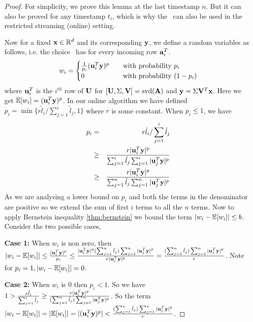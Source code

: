 \begin{proof}{\label{proof:onlineGuarantee}}
 For simplicity, we prove this lemma at the last timestamp $n$. But it can also be proved for any timestamp $t_{i}$, which is why the \online~can also be used in the restricted streaming (online) setting.
 
 Now for a fixed $\*x \in \~R^{d}$ and its corresponding $\*y$, we define a random variables as follows, i.e. the choice \online~has for every incoming row $\*a_{i}^{T}$.
 \[ w_{i} =
  \begin{cases}
    \frac{1}{p_{i}}(\*u_{i}^{T}\*y)^{p}  & \quad \text{with probability } p_{i} \\
    0 & \quad \text{with probability } (1-p_{i})
  \end{cases}
\]
where $\*u_{i}^{T}$ is the $i^{th}$ row of $\*U$ for $[\*U,\Sigma,\*V] = \mbox{svd}(\*A)$ and $\*y = \Sigma\*V^{T}\*x$. Here we get $\~E[w_{i}] = (\*u_{i}^{T}\*y)^{p}$. In our online algorithm we have defined $p_{i} = \min\{r\tilde{l}_{i}/\sum_{j=1}^{i}\tilde{l}_{j},1\}$ where $r$ is some constant. When $p_{i} \leq 1$, we have
\begin{eqnarray*}
 p_{i} &=& r\tilde{l}_{i}/\sum_{j=1}^{i}\tilde{l}_{j} \\
 &\geq& \frac{r|\*u_{i}^{T}\*y|^{p}}{\sum_{j=1}^{i}\tilde{l}_{j}\sum_{j=1}^{i}|\*u_{j}^{T}\*y|^{p}} \\ 
 &\geq& \frac{r|\*u_{i}^{T}\*y|^{p}}{\sum_{j=1}^{n}\tilde{l}_{j}\sum_{j=1}^{n}|\*u_{j}^{T}\*y|^{p}}
\end{eqnarray*}
As we are analysing a lower bound on $p_{i}$ and both the terms in the denominator are positive so we extend the sum of first $i$ terms to all the $n$ terms. Now to apply Bernstein inequality \ref{thm:bernstein} we bound the term $\vert w_{i} - \~E[w_{i}]\vert \leq b$. Consider the two possible cases,
 
 \textbf{Case 1:} When $w_{i}$ is non zero, then $|w_{i} - \~E[w_{i}]| \leq \frac{|\*u_{i}^{T}\*y|^{p}}{p_{i}} \leq \frac{|\*u_{i}^{T}\*y|^{p}(\sum_{j=1}^{n} \tilde{l}_{j})\sum_{j=1}^{n} |\*u_{j}^{T}\*y|^{p}}{r|\*u_{i}^{T}\*y|^{p}} = \frac{(\sum_{j=1}^{n} \tilde{l}_{j})\sum_{j=1}^{n} |\*u_{j}^{T}\*y|^{p}}{r}$. Note for $p_{i}=1, \vert w_{i} - \~E[w_{i}]\vert = 0$.
 
 \textbf{Case 2:} When $w_{i}$ is $0$ then $p_{i} < 1$. So we have $1 > \frac{r\tilde{l}_{i}}{\sum_{j=1}^{i}\tilde{l}_{j}} \geq \frac{r|\*u_{i}^{T}\*y|^{p}}{(\sum_{j=1}^{n} \tilde{l}_{j})\sum_{j=1}^{n}|\*u_{j}^{T}\*y|^{p}}$. So the term $|w_{i}-\~E[w_{i}] | = |\~E[w_{i}]| = |(\*u_{i}^{T}\*y)^{p}| < \frac{(\sum_{j=1}^{n} \tilde{l}_{j})\sum_{j=1}^{n} |\*u_{j}^{T}\*y|^{p}}{r}$. 
 

\end{proof}

